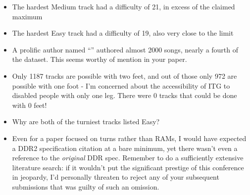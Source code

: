 \documentclass[12pt]{article}
\begin{document}
\begin{itemize}
\item The hardest Medium track had a difficulty of 21, in excess of the claimed maximum

\item The hardest Easy track had a difficulty of 19, also very close to the limit

\item A prolific author named ``'' authored almost 2000 songs, nearly a fourth of the dataset. This
seems worthy of mention in your paper.

\item Only 1187 tracks are possible with two feet, and out of those only 972 are possible with one
foot - I'm concerned about the accessibility of ITG to disabled people with only one leg.
There were 0 tracks that could be done with 0 feet!

\item Why are both of the turniest tracks listed Easy?

\item Even for a paper focused on turns rather than RAMs, I would have expected a DDR2 specification
citation at a bare minimum, yet there wasn't even a reference to the \textit{original} DDR spec.
Remember to do a sufficiently extensive literature search: if it wouldn't put the significant
prestige of this conference in jeopardy, I'd personally threaten to reject any of your subsequent
submissions that was guilty of such an omission.
\end{itemize}
 
\end{document}
